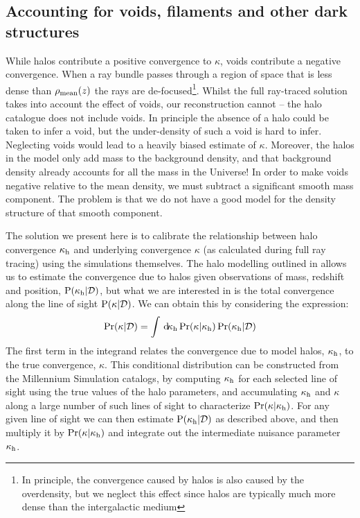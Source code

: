 \documentclass[useAMS,usenatbib]{mn2e}
\begin{document}

\subsection{Accounting for voids, filaments and other dark structures}
\label{sec:model:voids}

While halos contribute a positive convergence to $\kappa$, voids contribute
a negative convergence. When a ray bundle passes through a  region of space
that is less dense than $\rho_{\rm mean}(z)$ the rays are de-focused\footnote{In
principle, the convergence caused by halos is also caused by the overdensity,
but we neglect this effect since halos are typically much more dense than the
intergalactic medium}. Whilst the  full ray-traced solution takes into account
the effect of voids, our reconstruction cannot -- the halo catalogue does not
include voids. In principle the absence of a halo could be taken to infer a
void, but the under-density of such a void is hard to infer. Neglecting voids
would lead to a heavily biased estimate of $\kappa$. Moreover, the halos in 
the model only add mass to the background density, and that background density
already accounts for all the mass in the Universe! In order to make voids
negative relative to the mean density, we must subtract a significant smooth
mass component. The problem is that we do not have a good model for the
density structure of that smooth component. 

The solution we present here is to calibrate the relationship between halo
convergence $\kappa_{\rm h}$ and underlying convergence $\kappa$ (as calculated
during full ray tracing) using the simulations themselves.
The halo modelling \proceedure outlined in  allows 
us to estimate 
the convergence due to halos given observations of 
mass, redshift and position,
${\rm P}(\kappa_{\rm h}|\mathcal{D})$, but what we are interested in is the total convergence
along the line of sight ${\rm P}(\kappa|\mathcal{D})$. We can obtain this by
considering the expression:
\begin{equation}
\Pr(\kappa|\mathcal{D}) = \int \, \mathrm{d} \!\kappa_{\rm h} 
   \Pr(\kappa|\kappa_{\rm h}) \Pr(\kappa_{\rm h}|\mathcal{D})
\label{eq:kappaconv}   
\end{equation}
The first term in the integrand relates the convergence due to model halos,
$\kappa_{\rm h}$, to the true convergence, $\kappa$. This conditional distribution
can be constructed from the Millennium Simulation catalogs, by computing
$\kappa_{\rm h}$ for each selected line of sight using the true values of the halo
parameters,  and accumulating $\kappa_{\rm h}$ and $\kappa$ along a large number of
such lines of
sight to  characterize $\Pr(\kappa|\kappa_{\rm h})$.
For any given line of sight we can then estimate
${\rm P}(\kappa_{\rm h}|\mathcal{D})$ as described above, and then
multiply it by $\Pr(\kappa|\kappa_{\rm h})$ and integrate out the intermediate
nuisance parameter $\kappa_{\rm h}$. 
\end{document}
